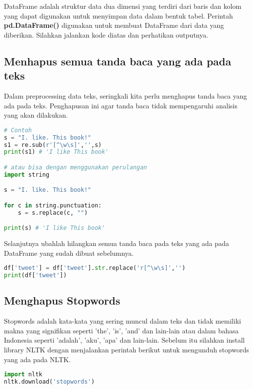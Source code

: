 \documentclass{article}
\begin{document}
    DataFrame adalah struktur data dua dimensi yang terdiri dari baris dan kolom yang dapat digunakan untuk menyimpan data dalam bentuk tabel. 
    Perintah \textbf{pd.DataFrame()} digunakan untuk membuat DataFrame dari data yang diberikan.
    Silahkan jalankan kode diatas dan perhatikan outputnya.

    \subsection*{Menhapus semua tanda baca yang ada pada teks}

    Dalam preprocessing data teks, seringkali kita perlu menghapus tanda baca yang ada pada teks.
    Penghapusan ini agar tanda baca tidak mempengaruhi analisis yang akan dilakukan.

    \begin{lstlisting}[language=python, style=pythonstyle]
# Contoh
s = "I. like. This book!"
s1 = re.sub(r'[^\w\s]','',s)
print(s1) # 'I like This book'

# atau bisa dengan menggunakan perulangan
import string

s = "I. like. This book!"

for c in string.punctuation:
    s = s.replace(c, "")

print(s) # 'I like This book'
    \end{lstlisting}

    Selanjutnya ubahlah hilangkan semua tanda baca pada teks yang ada pada DataFrame yang sudah dibuat sebelumnya.

    \begin{lstlisting}[language=python, style=pythonstyle]
df['tweet'] = df['tweet'].str.replace('r[^\w\s]','')
print(df['tweet'])
    \end{lstlisting}

    \subsection*{Menghapus Stopwords}

    Stopwords adalah kata-kata yang sering muncul dalam teks dan tidak memiliki makna yang signifikan seperti \@'the', \@'is', \@'and' dan lain-lain atau dalam bahasa Indonesia seperti \@'adalah', \@'aku', \@'apa' dan lain-lain.
    Sebelum itu silahkan install library NLTK dengan menjalankan perintah berikut untuk mengunduh stopwords yang ada pada NLTK\@.

    \begin{lstlisting}[language=python, style=pythonstyle]
import nltk
nltk.download('stopwords')
    \end{lstlisting}
\end{document}
